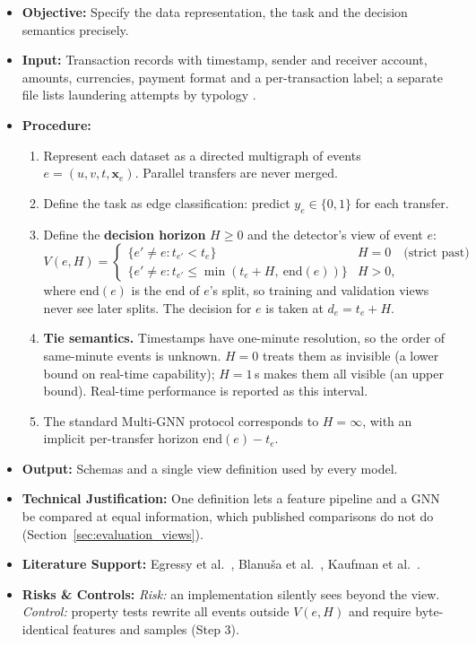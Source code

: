 \documentclass[11pt,a4paper]{article}
\begin{document}
\begin{itemize}[leftmargin=*]
    \item \textbf{Objective:} Specify the data representation, the task and the decision semantics precisely.
    \item \textbf{Input:} Transaction records with timestamp, sender and receiver account, amounts, currencies, payment format and a per-transaction label; a separate file lists laundering attempts by typology \cite{altman2023ibmaml}.
    \item \textbf{Procedure:}
    \begin{enumerate}[leftmargin=*]
        \item Represent each dataset as a directed multigraph of events $e=(u,v,t,\mathbf{x}_e)$. Parallel transfers are never merged.
        \item Define the task as edge classification: predict $y_e\in\{0,1\}$ for each transfer.
        \item Define the \textbf{decision horizon} $H\ge 0$ and the detector's view of event $e$:
        \begin{equation}
            V(e,H)=\begin{cases}
            \{e'\ne e : t_{e'}<t_e\} & H=0 \quad\text{(strict past)}\\
            \{e'\ne e : t_{e'}\le \min(t_e+H,\ \mathrm{end}(e))\} & H>0,
            \end{cases}
        \end{equation}
        where $\mathrm{end}(e)$ is the end of $e$'s split, so training and validation views never see later splits. The decision for $e$ is taken at $d_e=t_e+H$.
        \item \textbf{Tie semantics.} Timestamps have one-minute resolution, so the order of same-minute events is unknown. $H=0$ treats them as invisible (a lower bound on real-time capability); $H=1$\,s makes them all visible (an upper bound). Real-time performance is reported as this interval.
        \item The standard Multi-GNN protocol corresponds to $H=\infty$, with an implicit per-transfer horizon $\mathrm{end}(e)-t_e$.
    \end{enumerate}
    \item \textbf{Output:} Schemas and a single view definition used by every model.
    \item \textbf{Technical Justification:} One definition lets a feature pipeline and a GNN be compared at equal information, which published comparisons do not do (Section~\ref{sec:evaluation_views}).
    \item \textbf{Literature Support:} Egressy et al.\ \cite{egressy2024multigraph}, Blanu\v{s}a et al.\ \cite{blanusa2024gfp}, Kaufman et al.\ \cite{kaufman2012leakage}.
    \item \textbf{Risks \& Controls:} \textit{Risk:} an implementation silently sees beyond the view. \textit{Control:} property tests rewrite all events outside $V(e,H)$ and require byte-identical features and samples (Step 3).
\end{itemize}
\end{document}
